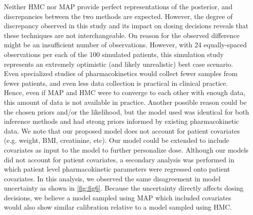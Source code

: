 Neither HMC nor MAP provide perfect representations of the posterior, and discrepancies between the two methods are expected. However, the degree of discrepancy observed in this study and its impact on dosing decisions reveals that these techniques are not interchangeable. On reason for the observed difference might be an insufficient number of observations.  However, with 24 equally-spaced observations per each of the 100 simulated patients, this simulation study represents an extremely optimistic (and likely unrealistic) best case scenario. Even specialized studies of pharmacokinetics would collect fewer samples from fewer patients, and even less data collection is practical in clinical practice. Hence, even if MAP and HMC were to converge to each other with enough data, this amount of data is not available in practice. Another possible reason could be the chosen priors and/or the likelihood, but the model used was identical for both inference methods and had strong priors informed by existing pharmacokinetic data.  We note that our proposed model does not account for patient covariates (e.g. weight, BMI, creatinine, etc).  Our model could be extended to include covariates as input to the model to further personalize dose. Although our models did not account for patient covariates, a secondary analysis was performed in which patient level pharmacokinetic parameters were regressed onto patient covariates.  In this analysis, we observed the same disagreement in model uncertainty as shown in \cref{fig:fig6}.  Because the uncertainty directly affects dosing decisions, we believe a model sampled using MAP which included covariates would also show similar calibration relative to a model sampled using HMC.


